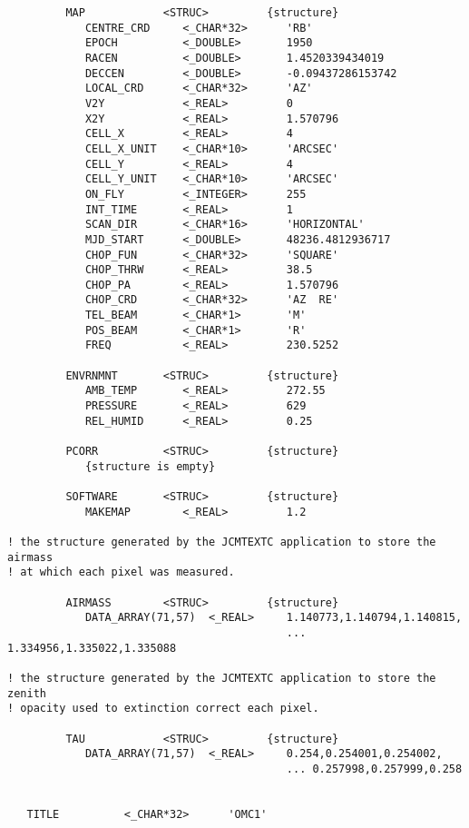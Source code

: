 \documentclass[twoside,11pt]{article}
\renewcommand{\_}{\texttt{\symbol{95}}}
\begin{document}
\begin{small}
\begin{verbatim}
         MAP            <STRUC>         {structure}
            CENTRE_CRD     <_CHAR*32>      'RB'
            EPOCH          <_DOUBLE>       1950
            RACEN          <_DOUBLE>       1.4520339434019
            DECCEN         <_DOUBLE>       -0.09437286153742
            LOCAL_CRD      <_CHAR*32>      'AZ'
            V2Y            <_REAL>         0
            X2Y            <_REAL>         1.570796
            CELL_X         <_REAL>         4
            CELL_X_UNIT    <_CHAR*10>      'ARCSEC'
            CELL_Y         <_REAL>         4
            CELL_Y_UNIT    <_CHAR*10>      'ARCSEC'
            ON_FLY         <_INTEGER>      255
            INT_TIME       <_REAL>         1
            SCAN_DIR       <_CHAR*16>      'HORIZONTAL'
            MJD_START      <_DOUBLE>       48236.4812936717
            CHOP_FUN       <_CHAR*32>      'SQUARE'
            CHOP_THRW      <_REAL>         38.5
            CHOP_PA        <_REAL>         1.570796
            CHOP_CRD       <_CHAR*32>      'AZ  RE'
            TEL_BEAM       <_CHAR*1>       'M'
            POS_BEAM       <_CHAR*1>       'R'
            FREQ           <_REAL>         230.5252

         ENVRNMNT       <STRUC>         {structure}
            AMB_TEMP       <_REAL>         272.55
            PRESSURE       <_REAL>         629
            REL_HUMID      <_REAL>         0.25

         PCORR          <STRUC>         {structure}
            {structure is empty}

         SOFTWARE       <STRUC>         {structure}
            MAKEMAP        <_REAL>         1.2

! the structure generated by the JCMTEXTC application to store the airmass
! at which each pixel was measured.

         AIRMASS        <STRUC>         {structure}
            DATA_ARRAY(71,57)  <_REAL>     1.140773,1.140794,1.140815,
                                           ... 1.334956,1.335022,1.335088

! the structure generated by the JCMTEXTC application to store the zenith
! opacity used to extinction correct each pixel.

         TAU            <STRUC>         {structure}
            DATA_ARRAY(71,57)  <_REAL>     0.254,0.254001,0.254002,
                                           ... 0.257998,0.257999,0.258


   TITLE          <_CHAR*32>      'OMC1'
\end{verbatim}
\end{small}
\end{document}
